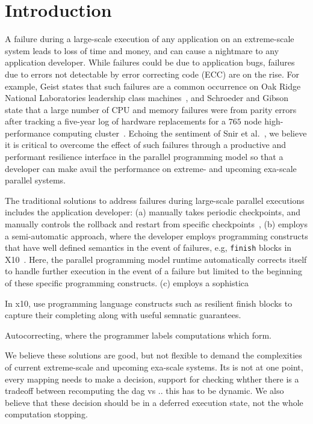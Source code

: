 \section{Introduction}

A failure during a large-scale execution of any application on an extreme-scale
system leads to loss of time and money, and can cause a nightmare to any
application developer. While failures could be due to application bugs,
failures due to errors not detectable by error correcting code (ECC) are on the
rise.  For example, Geist states that such failures are a common occurrence on
Oak Ridge National Laboratories leadership class machines~\cite{errors_ecc},
and Schroeder and Gibson state that a large number of CPU and memory failures
were from parity errors after tracking a five-year log of hardware replacements
for a $765$ node high-performance computing cluster~\cite{schroeder_gibson}.
Echoing the sentiment of Snir et al.~\cite{snir}, we believe it is critical to
overcome the effect of such failures through a productive and performant resilience 
interface in the parallel programming model so that a developer can make avail 
the performance on extreme- and upcoming exa-scale parallel systems.

The traditional solutions to address failures during large-scale parallel
executions includes the application developer: (a) manually takes periodic
checkpoints, and manually controls the rollback and restart from specific
checkpoints~\cite{checkpointrestart}, (b) employs a semi-automatic approach, 
where the developer employs programming constructs that have well defined 
semantics in the event of failures, e.g, \texttt{finish} blocks in X10~\cite{X10}.
Here, the parallel programming model runtime automatically corrects itself to 
handle further execution in the event of a failure but limited to the beginning
of these specific programming constructs. (c) employs a sophistica

In x10, use programming language constructs such as resilient finish blocks to
capture their completing along with useful semnatic guarantees. 

Autocorrecting, where the programmer labels computations which form. 

We believe these solutions are good, but not flexible to demand the
complexities of current extreme-scale and upcoming exa-scale systems. Its is
not at one point, every mapping needs to make a decision, support for checking
whther there is a tradeoff between recomputing the dag vs .. this has to be
dynamic. We also believe that these decision should be in a deferred execution
state, not the whole computation stopping.


